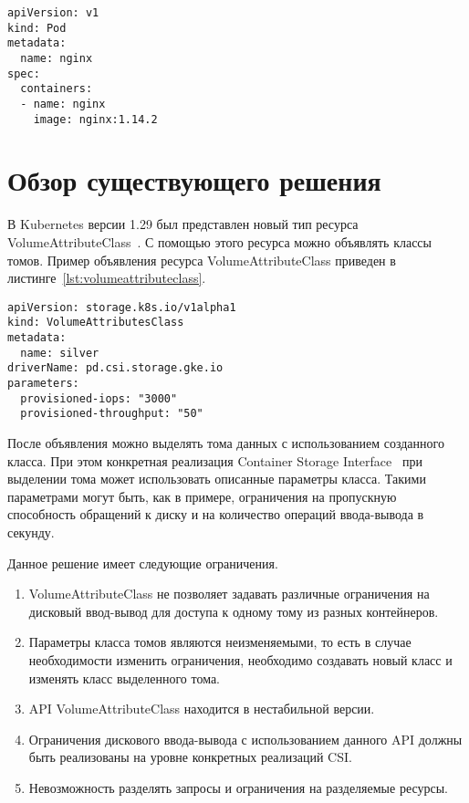 \begin{lstlisting}[label=lst:manifest, caption={Пример манифеста пода}]
apiVersion: v1
kind: Pod
metadata:
  name: nginx
spec:
  containers:
  - name: nginx
    image: nginx:1.14.2
\end{lstlisting}


\section{Обзор существующего решения}

В Kubernetes версии 1.29 был представлен новый тип ресурса VolumeAttributeClass~\cite{volumeattributeclass}. С помощью этого ресурса можно объявлять классы томов. Пример объявления ресурса VolumeAttributeClass приведен в листинге~\ref{lst:volumeattributeclass}.

\begin{lstlisting}[label=lst:volumeattributeclass, caption={Пример объявления ресурса VolumeAttributesClass}]
apiVersion: storage.k8s.io/v1alpha1
kind: VolumeAttributesClass
metadata:
  name: silver
driverName: pd.csi.storage.gke.io
parameters:
  provisioned-iops: "3000"
  provisioned-throughput: "50" 
\end{lstlisting}

После объявления можно выделять тома данных с использованием созданного класса. При этом конкретная реализация Container Storage Interface~\cite{csi} при выделении тома может использовать описанные параметры класса. Такими параметрами могут быть, как в примере, ограничения на пропускную способность обращений к диску и на количество операций ввода-вывода в секунду.

Данное решение имеет следующие ограничения.

\begin{enumerate}
	\item VolumeAttributeClass не позволяет задавать различные ограничения на дисковый ввод-вывод для доступа к одному тому из разных контейнеров.
	\item Параметры класса томов являются неизменяемыми, то есть в случае необходимости изменить ограничения, необходимо создавать новый класс и изменять класс выделенного тома.
	\item API VolumeAttributeClass находится в нестабильной версии.
	\item Ограничения дискового ввода-вывода с использованием данного API должны быть реализованы на уровне конкретных реализаций CSI.
	\item Невозможность разделять запросы и ограничения на разделяемые ресурсы.
\end{enumerate}
 
